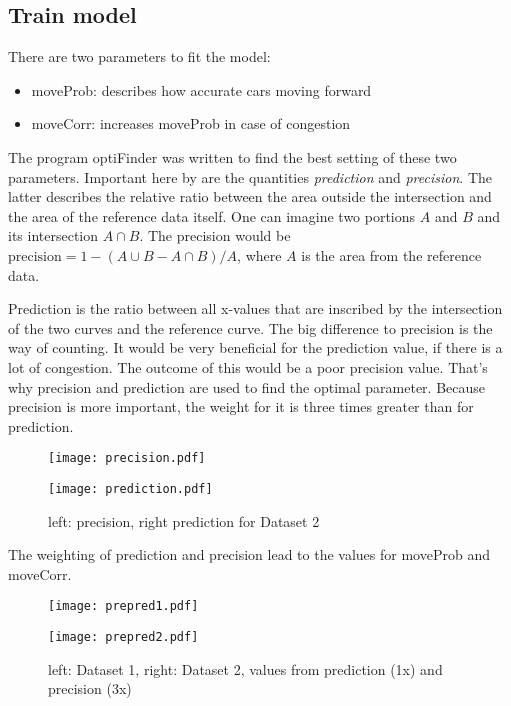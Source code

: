 \subsection{Train model}
There are two parameters to fit the model:
\begin{itemize}
\item moveProb: describes how accurate cars moving forward
\item moveCorr: increases moveProb in case of congestion
\end{itemize}

The program optiFinder was written to find the best setting of these two parameters. Important here by are the quantities \textit{prediction} and \textit{precision}.
The latter describes the relative ratio between the area outside the intersection and the area of the reference data itself. One can imagine two portions $A$ and $B$ and its intersection $A \cap B$. The precision would be $\textrm{precision} = 1 - (A \cup B - A \cap B) / A$, where $A$ is the area from the reference data.

Prediction is the ratio between all x-values that are inscribed by the intersection of the two curves and the reference curve. The big difference to precision is the way of counting. It would be very beneficial for the prediction value, if there is a lot of congestion. The outcome of this would be a poor precision value. That's why precision and prediction are used to find the optimal parameter. Because precision is more important, the weight for it is three times greater than for prediction.

\begin{figure}[H]
\begin{minipage}[t]{.5\textwidth}
\texttt{[image: precision.pdf]}
\end{minipage}
\begin{minipage}[t]{.5\textwidth}
\texttt{[image: prediction.pdf]}
\end{minipage}
\caption{left: precision, right prediction for Dataset 2}
\end{figure}

The weighting of prediction and precision lead to the values for moveProb and moveCorr.


\begin{figure}[H]
\begin{minipage}[t]{.48\textwidth}
\texttt{[image: prepred1.pdf]}
\end{minipage}
\begin{minipage}[t]{.48\textwidth}
\texttt{[image: prepred2.pdf]}
\end{minipage}
\caption{left: Dataset 1, right: Dataset 2, values from prediction (1x) and precision (3x)}
\end{figure}

